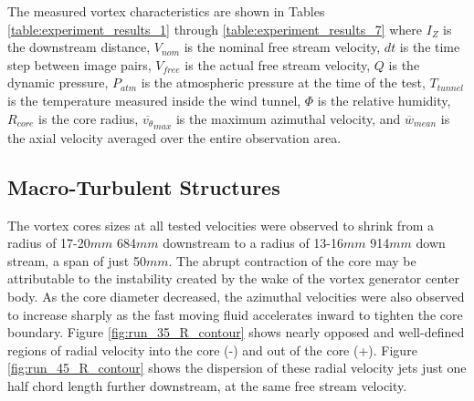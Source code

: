 

The measured vortex characteristics are shown in Tables
\ref{table:experiment_results_1} through \ref{table:experiment_results_7} where 
$I_Z$ is the downstream distance, 
$V_{nom}$ is the nominal free stream velocity, $dt$ is the time step between 
image pairs, $V_{free}$ is the actual free stream velocity, $Q$ is the dynamic 
pressure, $P_{atm}$ is the atmospheric pressure at the time of the test, 
$T_{tunnel}$ is the temperature measured inside the wind tunnel, $\Phi$ is the 
relative humidity, $R_{core}$ is the core radius, $\overline{v_{\theta}}_{max}$ 
is the maximum azimuthal velocity, and $\overline{w}_{mean}$ is the axial 
velocity averaged over the entire observation area.









\subsection{Macro-Turbulent Structures}
\label{section:macroturb}

The vortex cores sizes at all tested velocities were observed to shrink from 
a radius of 17-20$mm$ 684$mm$ downstream to a radius of 13-16$mm$ 914$mm$ down 
stream, a span of just 50$mm$. The abrupt contraction of the core 
may be attributable to the instability created by the wake of the vortex 
generator center body. As the core diameter decreased, the azimuthal velocities 
were also observed to increase sharply as the fast moving fluid accelerates 
inward to tighten the core boundary. Figure \ref{fig:run_35_R_contour} shows 
nearly opposed and well-defined regions of radial velocity into the core (-) 
and out of the core (+). Figure \ref{fig:run_45_R_contour} shows the dispersion 
of these radial velocity jets just one half chord length further downstream, at 
the same free stream velocity. 




